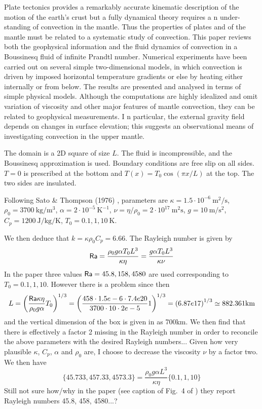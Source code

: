 \begin{center}
\begin{minipage}{13cm}
{\small 
Plate tectonics provides a remarkably accurate kinematic description of the
motion of the earth’s crust but a fully dynamical theory requires a n under-
standing of convection in the mantle. Thus the properties of plates and of the
mantle must be related to a systematic study of convection. This paper reviews
both the geophysical information and the fluid dynamics of convection in a
Boussinesq fluid of infinite Prandtl number. Numerical experiments have been
carried out on several simple two-dimensional models, in which convection is
driven by imposed horizontal temperature gradients or else by heating either
internally or from below. The results are presented and analysed in terms of
simple physical models. Although the computations are highly idealized and
omit variation of viscosity and other major features of mantle convection, they
can be related to geophysical measurements. I n particular, the external gravity
field depends on changes in surface elevation; this suggests an observational
means of investigating convection in the upper mantle.}
\end{minipage}
\end{center}

The domain is a 2D square of size $L$. The fluid is incompressible, and the Boussinesq 
approximation is used. Boundary conditions are free slip on all sides. $T=0$ is prescribed 
at the bottom and $T(x)=T_0 \cos (\pi x/L)$ at the top. The two sides are insulated.

Following Sato \& Thompson (1976) \cite{sath76}, 
parameters are $\kappa=1.5\cdot 10^{-6}~\si{\square\m\per\second}$, 
$\rho_0=3700~\si{\kg\per\cubic\metre}$, $\alpha=2\cdot 10^{-5}~\si{\kelvin}^{-1}$, 
$\nu=\eta/\rho_0=2\cdot10^{17}~\si{\square\metre\second}$, $g=10~\si{\metre\per\square\second}$, 
$C_p=1200~\si{\joule\per\kg\per\kelvin}$, $T_0=0.1,1,10~\si{\kelvin}$.  

We then deduce that $k=\kappa \rho_0 C_p = 6.66$. The Rayleigh number is given by
\[
{\mathsf{Ra}} 
= \frac{ \rho_0 g \alpha T_0 L^3  }{\kappa \eta}
= \frac{  g \alpha T_0 L^3  }{\kappa \nu}
\]
In the paper three values ${\mathsf{Ra}}=45.8,158,4580$ are used  corresponding to $T_0=0.1,1,10$. 
However there is a problem since then 
\[
L = \left( \frac{{\mathsf{Ra}} \kappa \eta}{\rho_0 g \alpha } T_0   \right)^{1/3}
= \left( \frac{458\cdot 1.5e-6\cdot 7.4e20}{3700\cdot 10\cdot 2e-5 } 1   \right)^{1/3}
= \left( 6.87e17 \right)^{1/3}
\simeq 882.361 \si{\kilo\metre}
\]
and the vertical dimension of the box is given in \cite{mcrw74} as 700\si{\km}. 
We then find that there is effectively a factor 2 missing in the Rayleigh number in order
to reconcile the above parameters with the desired Rayleigh numbers... 
Given how very plausible $\kappa$, $C_p$, $\alpha$ and $\rho_0$ are, I choose to 
decrease the viscosity $\nu$ by a factor two.
We then have 
\[
\{ 45.733, 457.33, 4573.3 \} = \frac{ \rho_0 g \alpha  L^3  }{\kappa \eta} \{ 0.1, 1, 10\}
\]
Still not sure how/why in the paper (see caption of Fig.~4 of \cite{mcrw74}) 
they report Rayleigh numbers 45.8, 458, 4580...?

